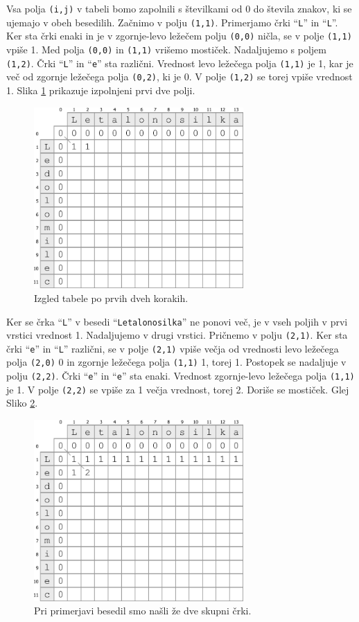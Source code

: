 \documentclass[a4paper, 12pt, twoside]{book}
\begin{document}
Vsa polja {\tt (i,j)} v tabeli bomo zapolnili s številkami od 0 do števila znakov, ki se ujemajo v obeh besedilih.
Začnimo v polju {\tt (1,1)}. Primerjamo črki “{\tt L}” in “{\tt L}”. Ker sta črki enaki in je v zgornje-levo ležečem polju {\tt (0,0)} ničla, se v polje {\tt (1,1)} vpiše 1. Med polja {\tt (0,0)} in {\tt (1,1)} vrišemo mostiček. Nadaljujemo s poljem {\tt (1,2)}. Črki “{\tt L}” in “{\tt e}” sta različni. Vrednost levo ležečega polja {\tt (1,1)} je 1, kar je več od zgornje ležečega polja {\tt (0,2)}, ki je 0. V polje {\tt (1,2)} se torej vpiše vrednost 1. Slika \ref{lcs2} prikazuje izpolnjeni prvi dve polji.

\begin{figure}[placement h]
\begin{center}
\includegraphics[width=8cm]{img/lcs2.pdf}
\end{center}
\caption{Izgled tabele po prvih dveh korakih.}
\label{lcs2}
\end{figure}

Ker se črka “{\tt L}” v besedi “{\tt Letalonosilka}” ne ponovi več, je v vseh poljih v prvi vrstici vrednost 1. Nadaljujemo v drugi vrstici. Pričnemo v polju {\tt (2,1)}. Ker sta črki “{\tt e}” in “{\tt L}” različni, se v polje {\tt (2,1)} vpiše večja od vrednosti levo ležečega polja {\tt (2,0)} 0 in zgornje ležečega polja {\tt (1,1)} 1, torej 1. Postopek se nadaljuje v polju {\tt (2,2)}. Črki “{\tt e}” in “{\tt e}” sta enaki. Vrednost zgornje-levo ležečega polja {\tt (1,1)} je 1. V polje {\tt (2,2)} se vpiše za 1 večja vrednost, torej 2. Doriše se mostiček. Glej Sliko \ref{lcs3}.

\begin{figure}[placement h]
\begin{center}
\includegraphics[width=8cm]{img/lcs3.pdf}
\end{center}
\caption{Pri primerjavi besedil smo našli že dve skupni črki.}
\label{lcs3}
\end{figure}
\end{document}
